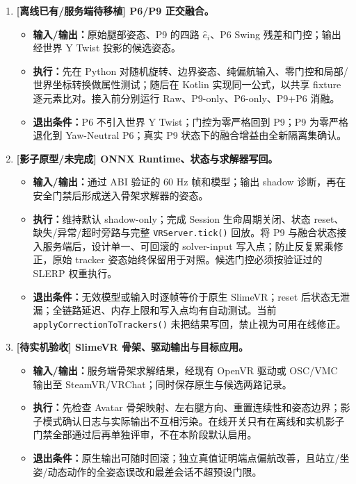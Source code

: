 \documentclass[UTF8,11pt,a4paper]{ctexart}
\begin{document}
\begin{enumerate}
  \item \textbf{[离线已有/服务端待移植] P6/P9 正交融合。}
  \begin{itemize}
    \item \textbf{输入/输出：}原始腿部姿态、P9 的四路 \(\hat e_i\)、P6 Swing 残差和门控；输出经世界 Y Twist 投影的候选姿态。
    \item \textbf{执行：}先在 Python 对随机旋转、边界姿态、纯偏航输入、零门控和局部/世界坐标转换做属性测试；随后在 Kotlin 实现同一公式，以共享 fixture 逐元素比对。接入前分别运行 Raw、P9-only、P6-only、P9+P6 消融。
    \item \textbf{退出条件：}P6 不引入世界 Y Twist；门控为零严格回到 P9；P9 为零严格退化到 Yaw-Neutral P6；真实 P9 状态下的融合增益由全新隔离集确认。
  \end{itemize}

  \item \textbf{[影子原型/未完成] ONNX Runtime、状态与求解器写回。}
  \begin{itemize}
    \item \textbf{输入/输出：}通过 ABI 验证的 60 Hz 帧和模型；输出 shadow 诊断，再在安全门禁后形成送入骨架求解器的姿态。
    \item \textbf{执行：}维持默认 shadow-only；完成 Session 生命周期关闭、状态 reset、缺失/异常/超时旁路与完整 \texttt{VRServer.tick()} 回放。将 P9 与融合状态接入服务端后，设计单一、可回滚的 solver-input 写入点；防止反复累乘修正，原始 tracker 姿态始终保留用于对照。候选门控必须按验证过的 SLERP 权重执行。
    \item \textbf{退出条件：}无效模型或输入时逐帧等价于原生 SlimeVR；reset 后状态无泄漏；全链路延迟、内存上限和写入点均有自动测试。当前 \texttt{applyCorrectionToTrackers()} 未把结果写回，禁止视为可用在线修正。
  \end{itemize}

  \item \textbf{[待实机验收] SlimeVR 骨架、驱动输出与目标应用。}
  \begin{itemize}
    \item \textbf{输入/输出：}服务端骨架求解结果，经现有 OpenVR 驱动或 OSC/VMC 输出至 SteamVR/VRChat；同时保存原生与候选两路记录。
    \item \textbf{执行：}先检查 Avatar 骨架映射、左右腿方向、重置连续性和姿态边界；影子模式确认日志与实际输出不互相污染。在线开关只有在离线和实机影子门禁全部通过后再单独评审，不在本阶段默认启用。
    \item \textbf{退出条件：}原生输出可随时回滚；独立真值证明端点偏航改善，且站立/坐姿/动态动作的全姿态误改和最差会话不超预设门限。
  \end{itemize}
\end{enumerate}
\end{document}
